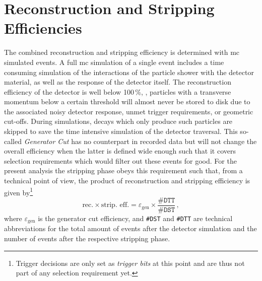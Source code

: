 \chapter{Reconstruction and Stripping Efficiencies}
\label{chap:stripeff}
The combined reconstruction and \gls{stripping} efficiency is determined with \gls{mc} simulated events.
A full \gls{mc} simulation of a single event includes a time consuming simulation of the interactions of the particle shower with the detector material, as well as the response of the detector itself.
The reconstruction efficiency of the \lhcb detector is well below 100\,\%, \eg{}, particles with a transverse momentum below a certain threshold will almost never be stored to disk due to the associated noisy detector response, unmet trigger requirements, or geometric cut-offs.
During simulations, decays which only produce such particles are skipped to save the time intensive simulation of the detector traversal.
This so-called \textit{Generator Cut} has no counterpart in recorded data but will not change the overall efficiency when the latter is defined wide enough such that it covers selection requirements which would filter out these events for good.
For the present analysis the \gls{stripping} phase obeys this requirement such that, from a technical point of view, the product of reconstruction and \gls{stripping} efficiency is given by\footnote{Trigger decisions are only set as \textit{trigger bits} at this point and are thus not part of any selection requirement yet.}
\begin{equation}
    \label{eq:stripeff_defeps}
    \text{rec.} \times \text{strip.\ eff.} = \varepsilon_{\text{gen}} \times \frac{\texttt{\#DTT}}{\texttt{\#DST}} \,,
\end{equation}
where $\varepsilon_{\text{gen}}$ is the generator cut efficiency, and \texttt{\#DST} and \texttt{\#DTT} are technical abbreviations for the total amount of events after the detector simulation and the number of events after the respective \gls{stripping} phase.

